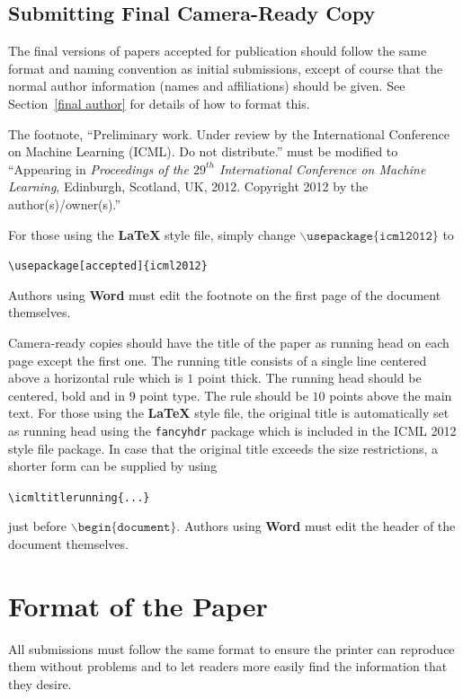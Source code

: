 \documentclass{article}
\begin{document}
\subsection{Submitting Final Camera-Ready Copy}

The final versions of papers accepted for publication should follow the
same format and naming convention as initial submissions, except of
course that the normal author information (names and affiliations)
should be given.  See Section~\ref{final author} for details of how to
format this.

The footnote, ``Preliminary work.  Under review by the International
Conference on Machine Learning (ICML).  Do not distribute.'' must be
modified to ``Appearing in \textit{Proceedings of the
$\mathit{29}^{th}$ International Conference on Machine Learning},
Edinburgh, Scotland, UK, 2012.  Copyright 2012 by the author(s)/owner(s).''

For those using the \textbf{\LaTeX} style file, simply change
$\mathtt{\backslash usepackage\{icml2012\}}$ to

\verb|\usepackage[accepted]{icml2012}|

\noindent
Authors using \textbf{Word} must edit the
footnote on the first page of the document themselves.

Camera-ready copies should have the title of the paper as running head
on each page except the first one.  The running title consists of a
single line centered above a horizontal rule which is $1$ point thick.
The running head should be centered, bold and in $9$ point type.  The
rule should be $10$ points above the main text.  For those using the
\textbf{\LaTeX} style file, the original title is automatically set as running
head using the {\tt fancyhdr} package which is included in the ICML
2012 style file package.  In case that the original title exceeds the
size restrictions, a shorter form can be supplied by using

\verb|\icmltitlerunning{...}|

just before $\mathtt{\backslash begin\{document\}}$.
Authors using \textbf{Word} must edit the header of the document themselves.

\section{Format of the Paper}

All submissions must follow the same format to ensure the printer can
reproduce them without problems and to let readers more easily find
the information that they desire.
\end{document}
